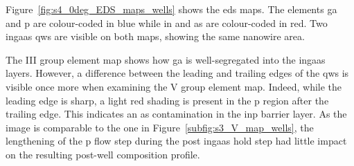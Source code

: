 Figure~\ref{fig:s4_0deg_EDS_maps_wells} shows the \acs{eds} maps. The elements \acl{ga} and \acl{p} are colour-coded in blue while \acl{in} and \acl{as} are colour-coded in red. Two \acs{ingaas} \acl{qw}s are visible on both maps, showing the same nanowire area. 

The III group element map shows how \acl{ga} is well-segregated into the \acs{ingaas} layers. However, a difference between the leading and trailing edges of the \acl{qw}s is visible once more when examining the V group element map. Indeed, while the leading edge is sharp, a light red shading is present in the \acl{p} region after the trailing edge. This indicates an \acl{as} contamination in the \acs{inp} barrier layer. As the image is comparable to the one in Figure~\ref{subfig:s3_V_map_wells}, the lengthening of the \acl{p} flow step during the post \acs{ingaas} hold step had little impact on the resulting post-well composition profile.

